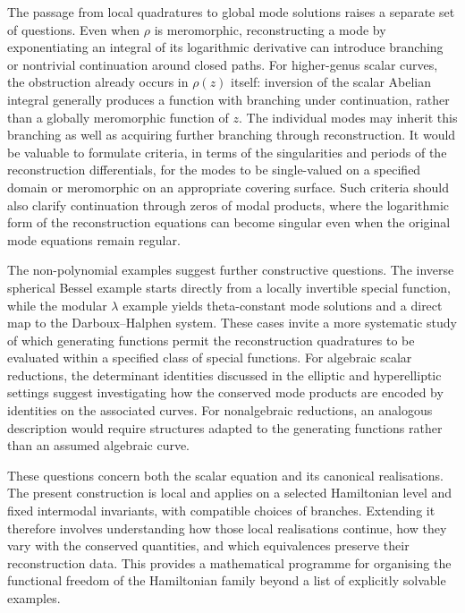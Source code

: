 \documentclass[11pt,a4paper]{article}
\numberwithin{equation}{section}
\begin{document}
The passage from local quadratures to global mode solutions raises a separate set of questions.
Even when $\rho$ is meromorphic, reconstructing a mode by exponentiating an integral of its logarithmic derivative can introduce branching or nontrivial continuation around closed paths.
For higher-genus scalar curves, the obstruction already occurs in $\rho(z)$ itself: inversion of the scalar Abelian integral generally produces a function with branching under continuation, rather than a globally meromorphic function of $z$. The individual modes may inherit this branching as well as acquiring further branching through reconstruction.
It would be valuable to formulate criteria, in terms of the singularities and periods of the reconstruction differentials, for the modes to be single-valued on a specified domain or meromorphic on an appropriate covering surface.
Such criteria should also clarify continuation through zeros of modal products, where the logarithmic form of the reconstruction equations can become singular even when the original mode equations remain regular.

The non-polynomial examples suggest further constructive questions.
The inverse spherical Bessel example starts directly from a locally invertible special function, while the modular $\lambda$ example yields theta-constant mode solutions and a direct map to the Darboux--Halphen system.
These cases invite a more systematic study of which generating functions permit the reconstruction quadratures to be evaluated within a specified class of special functions.
For algebraic scalar reductions, the determinant identities discussed in the elliptic and hyperelliptic settings suggest investigating how the conserved mode products are encoded by identities on the associated curves.
For nonalgebraic reductions, an analogous description would require structures adapted to the generating functions rather than an assumed algebraic curve.

These questions concern both the scalar equation and its canonical realisations.
The present construction is local and applies on a selected Hamiltonian level and fixed intermodal invariants, with compatible choices of branches.
Extending it therefore involves understanding how those local realisations continue, how they vary with the conserved quantities, and which equivalences preserve their reconstruction data.
This provides a mathematical programme for organising the functional freedom of the Hamiltonian family beyond a list of explicitly solvable examples.
\end{document}
